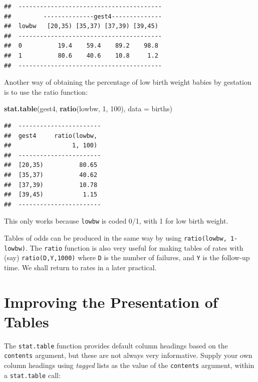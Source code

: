 \documentclass[
]{book}
\newenvironment{Shaded}{\begin{snugshade}}{\end{snugshade}}
\newcommand{\AttributeTok}[1]{\textcolor[rgb]{0.13,0.29,0.53}{#1}}
\newcommand{\DecValTok}[1]{\textcolor[rgb]{0.00,0.00,0.81}{#1}}
\newcommand{\FunctionTok}[1]{\textcolor[rgb]{0.13,0.29,0.53}{\textbf{#1}}}
\newcommand{\NormalTok}[1]{#1}
\begin{document}
\begin{verbatim}
##  ---------------------------------------- 
##         --------------gest4-------------- 
##  lowbw   [20,35) [35,37) [37,39) [39,45)  
##  ---------------------------------------- 
##  0          19.4    59.4    89.2    98.8  
##  1          80.6    40.6    10.8     1.2  
##  ----------------------------------------
\end{verbatim}

Another way of obtaining the percentage of low birth weight babies by
gestation is to use the ratio function:

\begin{Shaded}
\begin{Highlighting}[]
\FunctionTok{stat.table}\NormalTok{(gest4, }\FunctionTok{ratio}\NormalTok{(lowbw, }\DecValTok{1}\NormalTok{, }\DecValTok{100}\NormalTok{), }\AttributeTok{data =}\NormalTok{ births)}
\end{Highlighting}
\end{Shaded}

\begin{verbatim}
##  ----------------------- 
##  gest4     ratio(lowbw,  
##                 1, 100)  
##  ----------------------- 
##  [20,35)          80.65  
##  [35,37)          40.62  
##  [37,39)          10.78  
##  [39,45)           1.15  
##  -----------------------
\end{verbatim}

This only works because \texttt{lowbw} is coded 0/1, with 1 for low birth
weight.

Tables of odds can be produced in the same way by using
\texttt{ratio(lowbw,\ 1-lowbw)}. The \texttt{ratio} function is also very useful
for making tables of rates with (say) \texttt{ratio(D,Y,1000)} where
\texttt{D} is the number of failures, and \texttt{Y} is the follow-up time. We
shall return to rates in a later practical.

\section{Improving the Presentation of Tables}\label{improving-the-presentation-of-tables}

The \texttt{stat.table} function provides default column headings based
on the \texttt{contents} argument, but these are not always very informative.
Supply your own column headings using \emph{tagged} lists as the
value of the \texttt{contents} argument, within a \texttt{stat.table} call:
\end{document}

